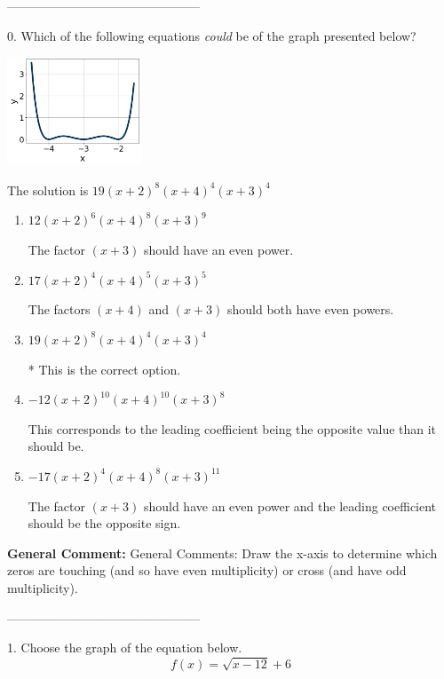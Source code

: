 \documentclass{extbook}[14pt]
\begin{document}
-----------------------------------------------

0. Which of the following equations \textit{could} be of the graph presented below?
\begin{center} \includegraphics[width=0.3\textwidth]{../Figures/polyGraphToFunctionA.png} \end{center} 

The solution is $ 19(x + 2)^{8} (x + 4)^{4} (x + 3)^{4} $ 

\begin{enumerate}[label=\Alph*.] 
\item $ 12(x + 2)^{6} (x + 4)^{8} (x + 3)^{9} $ 

 The factor $(x + 3)$ should have an even power. 
\item $ 17(x + 2)^{4} (x + 4)^{5} (x + 3)^{5} $ 

 The factors $(x + 4)$ and $(x + 3)$ should both have even powers. 
\item $ 19(x + 2)^{8} (x + 4)^{4} (x + 3)^{4} $ 

 * This is the correct option. 
\item $ -12(x + 2)^{10} (x + 4)^{10} (x + 3)^{8} $ 

 This corresponds to the leading coefficient being the opposite value than it should be. 
\item $ -17(x + 2)^{4} (x + 4)^{8} (x + 3)^{11} $ 

 The factor $(x + 3)$ should have an even power and the leading coefficient should be the opposite sign. 
\end{enumerate} 
 
\textbf{General Comment:} General Comments: Draw the x-axis to determine which zeros are touching (and so have even multiplicity) or cross (and have odd multiplicity). 

-----------------------------------------------

1. Choose the graph of the equation below.
\[ f(x) = \sqrt{x - 12} + 6 \] 
\end{document}
